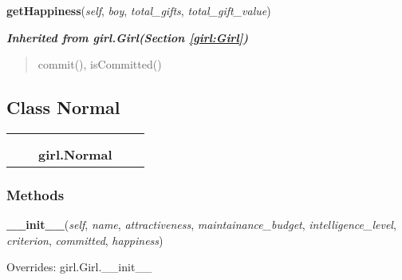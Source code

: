 \hspace{.8\funcindent}\begin{boxedminipage}{\funcwidth}

    \raggedright \textbf{getHappiness}(\textit{self}, \textit{boy}, \textit{total\_gifts}, \textit{total\_gift\_value})

\setlength{\parskip}{2ex}
\setlength{\parskip}{1ex}
    \end{boxedminipage}


\large{\textbf{\textit{Inherited from girl.Girl\textit{(Section \ref{girl:Girl})}}}}

\begin{quote}
commit(), isCommitted()
\end{quote}


\subsection{Class Normal}

    \label{girl:Normal}
\begin{tabular}{cccccc}
\multicolumn{2}{r}{\settowidth{\BCL}{girl.Girl}\multirow{2}{\BCL}{girl.Girl}}
&&
  \\\cline{3-3}
  &&\multicolumn{1}{c|}{}
&&
  \\
&&\multicolumn{2}{l}{\textbf{girl.Normal}}
\end{tabular}



  \subsubsection{Methods}

    \vspace{0.5ex}

\hspace{.8\funcindent}\begin{boxedminipage}{\funcwidth}

    \raggedright \textbf{\_\_init\_\_}(\textit{self}, \textit{name}, \textit{attractiveness}, \textit{maintainance\_budget}, \textit{intelligence\_level}, \textit{criterion}, \textit{committed}, \textit{happiness})

\setlength{\parskip}{2ex}
\setlength{\parskip}{1ex}
      Overrides: girl.Girl.\_\_init\_\_

    \end{boxedminipage}


